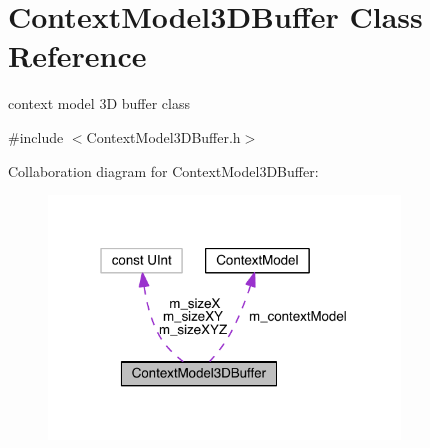 \hypertarget{class_context_model3_d_buffer}{}\section{Context\+Model3\+D\+Buffer Class Reference}
\label{class_context_model3_d_buffer}


context model 3D buffer class  




{\ttfamily \#include $<$Context\+Model3\+D\+Buffer.\+h$>$}



Collaboration diagram for Context\+Model3\+D\+Buffer\+:
\nopagebreak
\begin{figure}[H]
\begin{center}
\leavevmode
\includegraphics[width=265pt]{d9/dc6/class_context_model3_d_buffer__coll__graph}
\end{center}
\end{figure}
